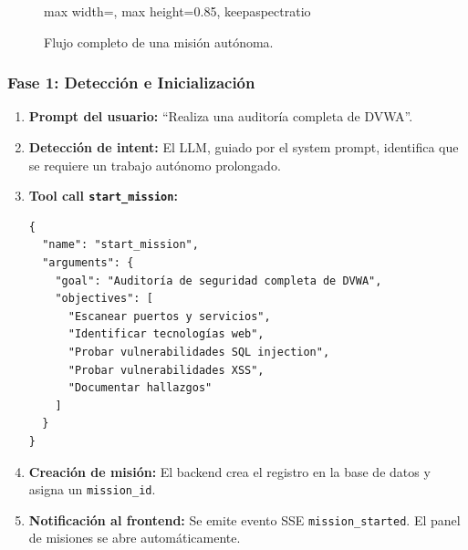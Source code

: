 \begin{figure}[H]
\begin{adjustbox}{max width=\textwidth, max height=0.85\textheight, keepaspectratio}
    \end{adjustbox}
    \caption{Flujo completo de una misión autónoma.}
    \label{fig:mission_flow}
\end{figure}

\subsubsection{Fase 1: Detección e Inicialización}

\begin{enumerate}
    \item \textbf{Prompt del usuario:} ``Realiza una auditoría completa de DVWA''.
    
    \item \textbf{Detección de intent:} El LLM, guiado por el system prompt, identifica que se requiere un trabajo autónomo prolongado.
    
    \item \textbf{Tool call \texttt{start\_mission}:}
    \begin{verbatim}
{
  "name": "start_mission",
  "arguments": {
    "goal": "Auditoría de seguridad completa de DVWA",
    "objectives": [
      "Escanear puertos y servicios",
      "Identificar tecnologías web",
      "Probar vulnerabilidades SQL injection",
      "Probar vulnerabilidades XSS",
      "Documentar hallazgos"
    ]
  }
}
    \end{verbatim}
    
    \item \textbf{Creación de misión:} El backend crea el registro en la base de datos y asigna un \texttt{mission\_id}.
    
    \item \textbf{Notificación al frontend:} Se emite evento SSE \texttt{mission\_started}. El panel de misiones se abre automáticamente.
\end{enumerate}

